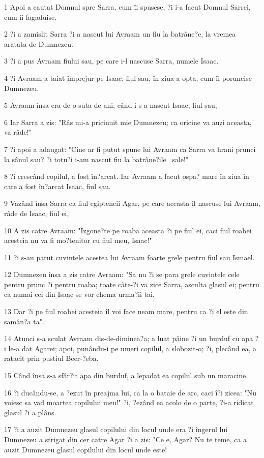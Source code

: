 \par 1 Apoi a cautat Domnul spre Sarra, cum îi spusese, ?i i-a facut Domnul Sarrei, cum îi fagaduise.
\par 2 ?i a zamislit Sarra ?i a nascut lui Avraam un fiu la batrâne?e, la vremea aratata de Dumnezeu.
\par 3 ?i a pus Avraam fiului sau, pe care i-l nascuse Sarra, numele Isaac.
\par 4 ?i Avraam a taiat împrejur pe Isaac, fiul sau, în ziua a opta, cum îi poruncise Dumnezeu.
\par 5 Avraam însa era de o suta de ani, când i s-a nascut Isaac, fiul sau,
\par 6 Iar Sarra a zis: "Râs mi-a pricinuit mie Dumnezeu; ca oricine va auzi aceasta, va râde!"
\par 7 ?i apoi a adaugat: "Cine ar fi putut spune lui Avraam ca Sarra va hrani prunci la sânul sau? ?i totu?i i-am nascut fiu la batrâne?ile  sale!"
\par 8 ?i crescând copilul, a fost în?arcat. Iar Avraam a facut ospa? mare în ziua în care a fost în?arcat Isaac, fiul sau.
\par 9 Vazând însa Sarra ca fiul egiptencii Agar, pe care aceasta îl nascuse lui Avraam, râde de Isaac, fiul ei,
\par 10 A zis catre Avraam: "Izgone?te pe roaba aceasta ?i pe fiul ei, caci fiul roabei acesteia nu va fi mo?tenitor cu fiul meu, Isaac!"
\par 11 ?i s-au parut cuvintele acestea lui Avraam foarte grele pentru fiul sau Ismael.
\par 12 Dumnezeu însa a zis catre Avraam: "Sa nu ?i se para grele cuvintele cele pentru prunc ?i pentru roaba; toate câte-?i va zice Sarra, asculta glasul ei; pentru ca numai cei din Isaac se vor chema urma?ii tai.
\par 13 Dar ?i pe fiul roabei acesteia îl voi face neam mare, pentru ca ?i el este din samân?a ta".
\par 14 Atunci s-a sculat Avraam dis-de-diminea?a; a luat pâine ?i un burduf cu apa ?i le-a dat Agarei; apoi, punându-i pe umeri copilul, a slobozit-o; ?i, plecând ea, a ratacit prin pustiul Beer-?eba.
\par 15 Când însa s-a sfâr?it apa din burduf, a lepadat ea copilul sub un maracine.
\par 16 ?i ducându-se, a ?ezut în preajma lui, ca la o bataie de arc, caci î?i zicea: "Nu voiesc sa vad moartea copilului meu!" ?i, ?ezând ea acolo de o parte, ?i-a ridicat glasul ?i a plâns.
\par 17 ?i a auzit Dumnezeu glasul copilului din locul unde era ?i îngerul lui Dumnezeu a strigat din cer catre Agar ?i a zis: "Ce e, Agar? Nu te teme, ca a auzit Dumnezeu glasul copilului din locul unde este!
